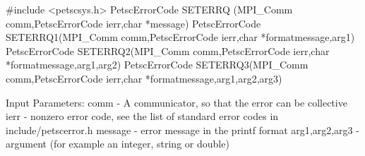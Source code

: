 #include <petscsys.h>
PetscErrorCode SETERRQ (MPI_Comm comm,PetscErrorCode ierr,char *message)
PetscErrorCode SETERRQ1(MPI_Comm comm,PetscErrorCode ierr,char *formatmessage,arg1)
PetscErrorCode SETERRQ2(MPI_Comm comm,PetscErrorCode ierr,char *formatmessage,arg1,arg2)
PetscErrorCode SETERRQ3(MPI_Comm comm,PetscErrorCode ierr,char *formatmessage,arg1,arg2,arg3)

Input Parameters:
comm - A communicator, so that the error can be collective
ierr - nonzero error code, see the list of standard error codes in include/petscerror.h
message - error message in the printf format
arg1,arg2,arg3 - argument (for example an integer, string or double)

